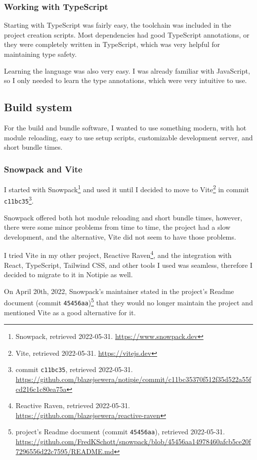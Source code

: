\hypertarget{working-with-typescript}{%
	\subsubsection{Working with TypeScript}\label{working-with-typescript}}

Starting with TypeScript was fairly easy, the toolchain was included in
the project creation scripts. Most dependencies had good TypeScript
annotations, or they were completely written in TypeScript, which was
very helpful for maintaining type safety.

Learning the language was also very easy. I was already familiar with
JavaScript, so I only needed to learn the type annotations, which were
very intuitive to use.

\hypertarget{build-system}{%
	\subsection{Build system}\label{build-system}}

For the build and bundle software, I wanted to use something modern,
with hot module reloading, easy to use setup scripts, customizable
development server, and short bundle times.

\hypertarget{snowpack-and-vite}{%
	\subsubsection{Snowpack and Vite}\label{snowpack-and-vite}}

I started with Snowpack\footnote{Snowpack, retrieved 2022-05-31.
	\url{https://www.snowpack.dev}} and used it until I decided to move to
Vite\footnote{Vite, retrieved 2022-05-31. \url{https://vitejs.dev}} in
commit \texttt{c11bc35}\footnote{commit \texttt{c11bc35}, retrieved
	2022-05-31.
	\url{https://github.com/blazejsewera/notipie/commit/c11bc35370f512f35d522a55fcd216c1c80ea75a}}.

Snowpack offered both hot module reloading and short bundle times,
however, there were some minor problems from time to time, the project
had a slow development, and the alternative, Vite did not seem to have
those problems.

I tried Vite in my other project, Reactive Raven\footnote{Reactive
	Raven, retrieved 2022-05-31.
	\url{https://github.com/blazejsewera/reactive-raven}}, and the
integration with React, TypeScript, Tailwind CSS, and other tools I used
was seamless, therefore I decided to migrate to it in Notipie as well.

On April 20th, 2022, Snowpack's maintainer stated in the project's
Readme document (commit \texttt{45456aa})\footnote{project's Readme
	document (commit \texttt{45456aa}), retrieved 2022-05-31.
	\url{https://github.com/FredKSchott/snowpack/blob/45456aa14978460afcb5ce20f7296556d22c7595/README.md}}
that they would no longer maintain the project and mentioned Vite as a
good alternative for it.
